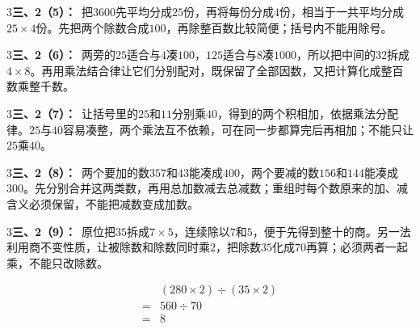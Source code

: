 \documentclass[multi=snippet,border={5bp 20bp 5bp 5bp}]{standalone}
\newenvironment{snippet}[3]{\begin{minipage}{#1bp}\color{answerred}\fontsize{#2}{#3}\selectfont\raggedright}{\end{minipage}}
\begin{document}
\begin{snippet}{505}{11.5}{14}\begin{multicols}{3}\raggedcolumns \textbf{三、2（5）：}\ 把\(3600\)\allowbreak 先平均分成\(25\)\allowbreak 份，再将每份分成\(4\)\allowbreak 份，相当于一共平均分成\(25\times4\)\allowbreak 份。先把两个除数合成\(100\)\allowbreak ，再除整百数比较简便；括号内不能用除号。\end{multicols}\end{snippet}
\begin{snippet}{505}{11.5}{14}\begin{multicols}{3}\raggedcolumns \textbf{三、2（6）：}\ 两旁的\(25\)\allowbreak 适合与\(4\)\allowbreak 凑\(100\)\allowbreak ，\(125\)\allowbreak 适合与\(8\)\allowbreak 凑\(1000\)\allowbreak ，所以把中间的\(32\)\allowbreak 拆成\(4\times8\)\allowbreak 。再用乘法结合律让它们分别配对，既保留了全部因数，又把计算化成整百数乘整千数。\end{multicols}\end{snippet}
\begin{snippet}{505}{11.5}{14}\begin{multicols}{3}\raggedcolumns \textbf{三、2（7）：}\ 让括号里的\(25\)\allowbreak 和\(11\)\allowbreak 分别乘\(40\)\allowbreak ，得到的两个积相加，依据乘法分配律。\(25\)\allowbreak 与\(40\)\allowbreak 容易凑整，两个乘法互不依赖，可在同一步都算完后再相加；不能只让\(25\)\allowbreak 乘\(40\)\allowbreak 。\end{multicols}\end{snippet}
\begin{snippet}{505}{11.5}{14}\begin{multicols}{3}\raggedcolumns \textbf{三、2（8）：}\ 两个要加的数\(357\)\allowbreak 和\(43\)\allowbreak 能凑成\(400\)\allowbreak ，两个要减的数\(156\)\allowbreak 和\(144\)\allowbreak 能凑成\(300\)\allowbreak 。先分别合并这两类数，再用总加数减去总减数；重组时每个数原来的加、减含义必须保留，不能把减数变成加数。\end{multicols}\end{snippet}
\begin{snippet}{505}{11.5}{14}\begin{multicols}{3}\raggedcolumns \textbf{三、2（9）：}\ 原位把\(35\)\allowbreak 拆成\(7\times5\)\allowbreak ，连续除以\(7\)\allowbreak 和\(5\)\allowbreak ，便于先得到整十的商。另一法利用商不变性质，让被除数和除数同时乘\(2\)\allowbreak ，把除数\(35\)\allowbreak 化成\(70\)\allowbreak 再算；必须两者一起乘，不能只改除数。\par \[\begin{aligned}&(280\times2)\div(35\times2)\\={}&560\div70\\={}&8\end{aligned}\]\end{multicols}\end{snippet}
\end{document}
